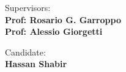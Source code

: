 \begin{titlepage}
\begin{center}
\end{center}
\vspace{20mm}

\begin{minipage}[t]{0.47\textwidth}
	{\large{Supervisors:}{\normalsize\vspace{3mm}
	\bf\\ \large{Prof: Rosario G. Garroppo} \normalsize\vspace{3mm}\bf}
    {\normalsize\vspace{3mm}\bf\\ \large{Prof: Alessio Giorgetti} \normalsize\vspace{3mm}\bf}}
\end{minipage}
\hfill
\begin{minipage}[t]{0.47\textwidth}\raggedleft
	{\large{Candidate:}{\normalsize\vspace{3mm} \bf\\ \large{Hassan Shabir}}}
\end{minipage}

\vspace{10mm}
\hrulefill
\\

\end{titlepage}